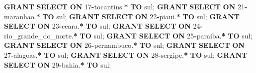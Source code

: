 \documentclass[
]{book}
\newenvironment{Shaded}{\begin{snugshade}}{\end{snugshade}}
\newcommand{\DecValTok}[1]{\textcolor[rgb]{0.00,0.00,0.81}{#1}}
\newcommand{\KeywordTok}[1]{\textcolor[rgb]{0.13,0.29,0.53}{\textbf{#1}}}
\newcommand{\NormalTok}[1]{#1}
\newcommand{\OperatorTok}[1]{\textcolor[rgb]{0.81,0.36,0.00}{\textbf{#1}}}
\newcommand{\StringTok}[1]{\textcolor[rgb]{0.31,0.60,0.02}{#1}}
\begin{document}
\begin{Shaded}
\begin{Highlighting}[]
\KeywordTok{GRANT} \KeywordTok{SELECT} \KeywordTok{ON}\NormalTok{ \textasciigrave{}}\DecValTok{17}\OperatorTok{{-}}\NormalTok{tocantins\textasciigrave{}.}\OperatorTok{*}          \KeywordTok{TO} \StringTok{\textquotesingle{}sul\textquotesingle{}}\NormalTok{;}
\KeywordTok{GRANT} \KeywordTok{SELECT} \KeywordTok{ON}\NormalTok{ \textasciigrave{}}\DecValTok{21}\OperatorTok{{-}}\NormalTok{maranhao\textasciigrave{}.}\OperatorTok{*}           \KeywordTok{TO} \StringTok{\textquotesingle{}sul\textquotesingle{}}\NormalTok{;}
\KeywordTok{GRANT} \KeywordTok{SELECT} \KeywordTok{ON}\NormalTok{ \textasciigrave{}}\DecValTok{22}\OperatorTok{{-}}\NormalTok{piaui\textasciigrave{}.}\OperatorTok{*}              \KeywordTok{TO} \StringTok{\textquotesingle{}sul\textquotesingle{}}\NormalTok{;}
\KeywordTok{GRANT} \KeywordTok{SELECT} \KeywordTok{ON}\NormalTok{ \textasciigrave{}}\DecValTok{23}\OperatorTok{{-}}\NormalTok{ceara\textasciigrave{}.}\OperatorTok{*}              \KeywordTok{TO} \StringTok{\textquotesingle{}sul\textquotesingle{}}\NormalTok{;}
\KeywordTok{GRANT} \KeywordTok{SELECT} \KeywordTok{ON}\NormalTok{ \textasciigrave{}}\DecValTok{24}\OperatorTok{{-}}\NormalTok{rio\_grande\_do\_norte\textasciigrave{}.}\OperatorTok{*} \KeywordTok{TO} \StringTok{\textquotesingle{}sul\textquotesingle{}}\NormalTok{;}
\KeywordTok{GRANT} \KeywordTok{SELECT} \KeywordTok{ON}\NormalTok{ \textasciigrave{}}\DecValTok{25}\OperatorTok{{-}}\NormalTok{paraiba\textasciigrave{}.}\OperatorTok{*}            \KeywordTok{TO} \StringTok{\textquotesingle{}sul\textquotesingle{}}\NormalTok{;}
\KeywordTok{GRANT} \KeywordTok{SELECT} \KeywordTok{ON}\NormalTok{ \textasciigrave{}}\DecValTok{26}\OperatorTok{{-}}\NormalTok{pernambuco\textasciigrave{}.}\OperatorTok{*}         \KeywordTok{TO} \StringTok{\textquotesingle{}sul\textquotesingle{}}\NormalTok{;}
\KeywordTok{GRANT} \KeywordTok{SELECT} \KeywordTok{ON}\NormalTok{ \textasciigrave{}}\DecValTok{27}\OperatorTok{{-}}\NormalTok{alagoas\textasciigrave{}.}\OperatorTok{*}            \KeywordTok{TO} \StringTok{\textquotesingle{}sul\textquotesingle{}}\NormalTok{;}
\KeywordTok{GRANT} \KeywordTok{SELECT} \KeywordTok{ON}\NormalTok{ \textasciigrave{}}\DecValTok{28}\OperatorTok{{-}}\NormalTok{sergipe\textasciigrave{}.}\OperatorTok{*}            \KeywordTok{TO} \StringTok{\textquotesingle{}sul\textquotesingle{}}\NormalTok{;}
\KeywordTok{GRANT} \KeywordTok{SELECT} \KeywordTok{ON}\NormalTok{ \textasciigrave{}}\DecValTok{29}\OperatorTok{{-}}\NormalTok{bahia\textasciigrave{}.}\OperatorTok{*}              \KeywordTok{TO} \StringTok{\textquotesingle{}sul\textquotesingle{}}\NormalTok{;}

\end{Highlighting}
\end{Shaded}
\end{document}

